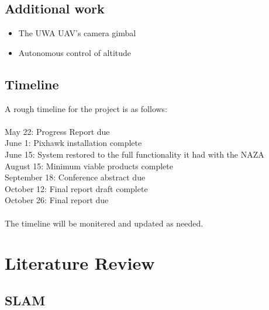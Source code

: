 \documentclass[a4paper, 12pt, titlepage]{article}
\begin{document}
  		
  		
  		\subsection{Additional work}
  		\begin{itemize}
  		 
  		\item The UWA UAV's camera gimbal
  		
  		\item Autonomous control of altitude
  		
  		\end{itemize}
  		
  		\subsection{Timeline}
  		A rough timeline for the project is as follows:
  		\\
  		\\May 22: Progress Report due
  		\\June 1: Pixhawk installation complete
  		\\June 15: System restored to the full functionality it had with the NAZA
  		\\August 15: Minimum viable products complete
  		\\September 18: Conference abstract due
  		\\October 12: Final report draft complete
  		\\October 26: Final report due
  		\\
  		\\The timeline will be monitered and updated as needed. 






\section{Literature Review}
	\subsection{SLAM}
\end{document}
